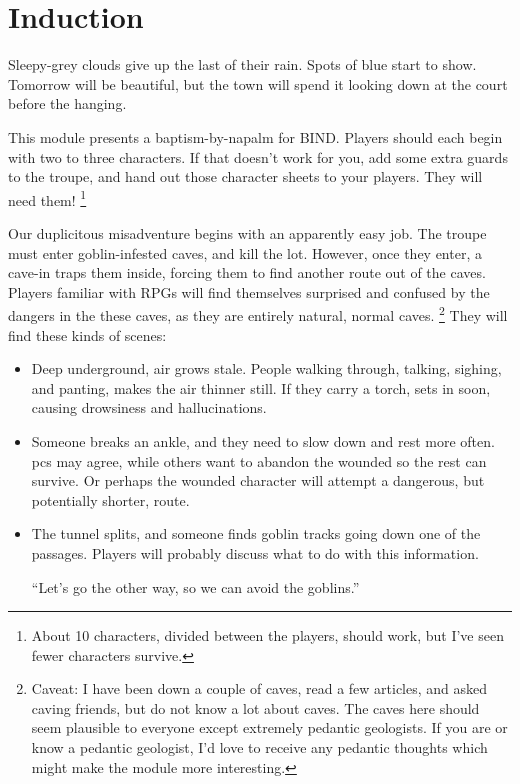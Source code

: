 \section{Induction}

\begin{multicols}{2}

\begin{boxtext}
  Sleepy-grey clouds give up the last of their rain.
  Spots of blue start to show.
  Tomorrow will be beautiful, but the town will spend it looking down at the \gls{court} before the hanging.
\end{boxtext}

\noindent
This module presents a baptism-by-napalm for BIND.
Players should each begin with two to three characters.
If that doesn't work for you, add some extra \glspl{guard} to the troupe, and hand out those character sheets to your players.
They will need them!%
\footnote{About 10 characters, divided between the players, should work, but I've seen fewer characters survive.}

Our duplicitous misadventure begins with an apparently easy job.
The troupe must enter goblin-infested caves, and kill the lot.
However, once they enter, a cave-in traps them inside, forcing them to find another route out of the caves.
Players familiar with RPGs will find themselves surprised and confused by the dangers in the these caves, as they are entirely natural, normal caves.%
\footnote{Caveat: I have been down a couple of caves, read a few articles, and asked caving friends, but do not know a lot about caves.
The caves here should seem plausible to everyone except extremely pedantic geologists.
If you are or know a pedantic geologist, I'd love to receive any pedantic thoughts which might make the module more interesting.}
They will find these kinds of scenes:

\begin{itemize}
	\item
  Deep underground, air grows stale.
  People walking through, talking, sighing, and panting, makes the air thinner still.
  If they carry a torch,  sets in soon, causing drowsiness and hallucinations.
	\item
	Someone breaks an ankle, and they need to slow down and rest more often.
  \Glspl{pc} may agree, while others want to abandon the wounded so the rest can survive.
	Or perhaps the wounded character will attempt a dangerous, but potentially shorter, route.
	\item
	The tunnel splits, and someone finds goblin tracks going down one of the passages.
	Players will probably discuss what to do with this information.
	\begin{speechtext}
		``Let's go the other way, so we can avoid the goblins.''
	\end{speechtext}


\end{itemize}
\end{multicols}
